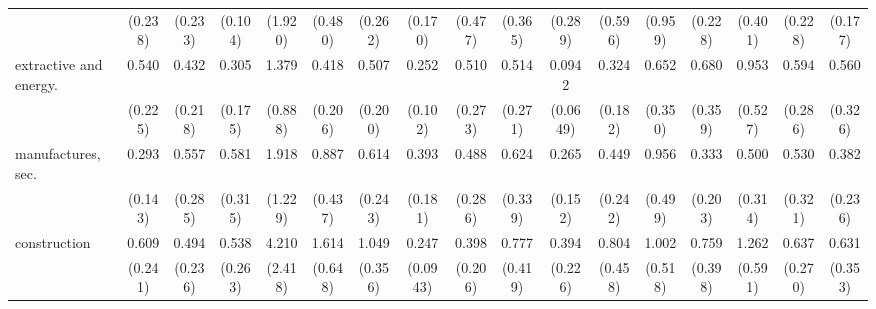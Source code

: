 {\begin{tabular}{l*{16}{c}}
                    &     (0.238)         &     (0.233)         &     (0.104)         &     (1.920)         &     (0.480)         &     (0.262)         &     (0.170)         &     (0.477)         &     (0.365)         &     (0.289)         &     (0.596)         &     (0.959)         &     (0.228)         &     (0.401)         &     (0.228)         &     (0.177)         \\
[1em]
extractive and energy.&       0.540         &       0.432         &       0.305\sym{*}  &       1.379         &       0.418         &       0.507         &       0.252\sym{***}&       0.510         &       0.514         &      0.0942\sym{***}&       0.324\sym{*}  &       0.652         &       0.680         &       0.953         &       0.594         &       0.560         \\
                    &     (0.225)         &     (0.218)         &     (0.175)         &     (0.888)         &     (0.206)         &     (0.200)         &     (0.102)         &     (0.273)         &     (0.271)         &    (0.0649)         &     (0.182)         &     (0.350)         &     (0.359)         &     (0.527)         &     (0.286)         &     (0.326)         \\
[1em]
manufactures, sec.  &       0.293\sym{*}  &       0.557         &       0.581         &       1.918         &       0.887         &       0.614         &       0.393\sym{*}  &       0.488         &       0.624         &       0.265\sym{*}  &       0.449         &       0.956         &       0.333         &       0.500         &       0.530         &       0.382         \\
                    &     (0.143)         &     (0.285)         &     (0.315)         &     (1.229)         &     (0.437)         &     (0.243)         &     (0.181)         &     (0.286)         &     (0.339)         &     (0.152)         &     (0.242)         &     (0.499)         &     (0.203)         &     (0.314)         &     (0.321)         &     (0.236)         \\
[1em]
construction        &       0.609         &       0.494         &       0.538         &       4.210\sym{*}  &       1.614         &       1.049         &       0.247\sym{***}&       0.398         &       0.777         &       0.394         &       0.804         &       1.002         &       0.759         &       1.262         &       0.637         &       0.631         \\
                    &     (0.241)         &     (0.236)         &     (0.263)         &     (2.418)         &     (0.648)         &     (0.356)         &    (0.0943)         &     (0.206)         &     (0.419)         &     (0.226)         &     (0.458)         &     (0.518)         &     (0.398)         &     (0.591)         &     (0.270)         &     (0.353)         \\

\end{tabular}}
